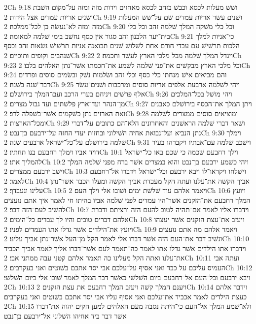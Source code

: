 2Ch 9:18  ושׁשׁ מעלות לכסא וכבשׁ בזהב לכסא מאחזים וידות מזה ומזה על־מקום השׁבת ושׁנים אריות עמדים אצל הידות׃
2Ch 9:19  ושׁנים עשׂר אריות עמדים שׁם על־שׁשׁ המעלות מזה ומזה לא־נעשׂה כן לכל־ממלכה׃
2Ch 9:20  וכל כלי משׁקה המלך שׁלמה זהב וכל כלי בית־יער הלבנון זהב סגור אין כסף נחשׁב בימי שׁלמה למאומה׃
2Ch 9:21  כי־אניות למלך הלכות תרשׁישׁ עם עבדי חורם אחת לשׁלושׁ שׁנים תבואנה אניות תרשׁישׁ נשׂאות זהב וכסף שׁנהבים וקופים ותוכיים׃
2Ch 9:22  ויגדל המלך שׁלמה מכל מלכי הארץ לעשׁר וחכמה׃
2Ch 9:23  וכל מלכי הארץ מבקשׁים את־פני שׁלמה לשׁמע את־חכמתו אשׁר־נתן האלהים בלבו׃
2Ch 9:24  והם מביאים אישׁ מנחתו כלי כסף וכלי זהב ושׂלמות נשׁק ובשׂמים סוסים ופרדים דבר־שׁנה בשׁנה׃
2Ch 9:25  ויהי לשׁלמה ארבעת אלפים אריות סוסים ומרכבות ושׁנים־עשׂר אלף פרשׁים ויניחם בערי הרכב ועם־המלך בירושׁלם׃
2Ch 9:26  ויהי מושׁל בכל־המלכים מן־הנהר ועד־ארץ פלשׁתים ועד גבול מצרים׃
2Ch 9:27  ויתן המלך את־הכסף בירושׁלם כאבנים ואת הארזים נתן כשׁקמים אשׁר־בשׁפלה לרב׃
2Ch 9:28  ומוציאים סוסים ממצרים לשׁלמה ומכל־הארצות׃
2Ch 9:29  ושׁאר דברי שׁלמה הראשׁנים והאחרונים הלא־הם כתובים על־דברי נתן הנביא ועל־נבואת אחיה השׁילוני ובחזות יעדי החזה על־ירבעם בן־נבט׃
2Ch 9:30  וימלך שׁלמה בירושׁלם על־כל־ישׂראל ארבעים שׁנה׃
2Ch 9:31  וישׁכב שׁלמה עם־אבתיו ויקברהו בעיר דויד אביו וימלך רחבעם בנו תחתיו׃
2Ch 10:1  וילך רחבעם שׁכמה כי שׁכם באו כל־ישׂראל להמליך אתו׃
2Ch 10:2  ויהי כשׁמע ירבעם בן־נבט והוא במצרים אשׁר ברח מפני שׁלמה המלך וישׁב ירבעם ממצרים׃
2Ch 10:3  וישׁלחו ויקראו־לו ויבא ירבעם וכל־ישׂראל וידברו אל־רחבעם לאמר׃
2Ch 10:4  אביך הקשׁה את־עלנו ועתה הקל מעבדת אביך הקשׁה ומעלו הכבד אשׁר־נתן עלינו ונעבדך׃
2Ch 10:5  ויאמר אלהם עוד שׁלשׁת ימים ושׁובו אלי וילך העם׃
2Ch 10:6  ויועץ המלך רחבעם את־הזקנים אשׁר־היו עמדים לפני שׁלמה אביו בהיתו חי לאמר איך אתם נועצים להשׁיב לעם־הזה דבר׃
2Ch 10:7  וידברו אליו לאמר אם־תהיה לטוב להעם הזה ורציתם ודברת אלהם דברים טובים והיו לך עבדים כל־הימים׃
2Ch 10:8  ויעזב את־עצת הזקנים אשׁר יעצהו ויועץ את־הילדים אשׁר גדלו אתו העמדים לפניו׃
2Ch 10:9  ויאמר אלהם מה אתם נועצים ונשׁיב דבר את־העם הזה אשׁר דברו אלי לאמר הקל מן־העל אשׁר־נתן אביך עלינו׃
2Ch 10:10  וידברו אתו הילדים אשׁר גדלו אתו לאמר כה־תאמר לעם אשׁר־דברו אליך לאמר אביך הכביד את־עלנו ואתה הקל מעלינו כה תאמר אלהם קטני עבה ממתני אבי׃
2Ch 10:11  ועתה אבי העמיס עליכם על כבד ואני אסיף על־עלכם אבי יסר אתכם בשׁוטים ואני בעקרבים׃
2Ch 10:12  ויבא ירבעם וכל־העם אל־רחבעם ביום השׁלשׁי כאשׁר דבר המלך לאמר שׁובו אלי ביום השׁלשׁי׃
2Ch 10:13  ויענם המלך קשׁה ויעזב המלך רחבעם את עצת הזקנים׃
2Ch 10:14  וידבר אלהם כעצת הילדים לאמר אכביד את־עלכם ואני אסיף עליו אבי יסר אתכם בשׁוטים ואני בעקרבים׃
2Ch 10:15  ולא־שׁמע המלך אל־העם כי־היתה נסבה מעם האלהים למען הקים יהוה את־דברו אשׁר דבר ביד אחיהו השׁלוני אל־ירבעם בן־נבט׃
